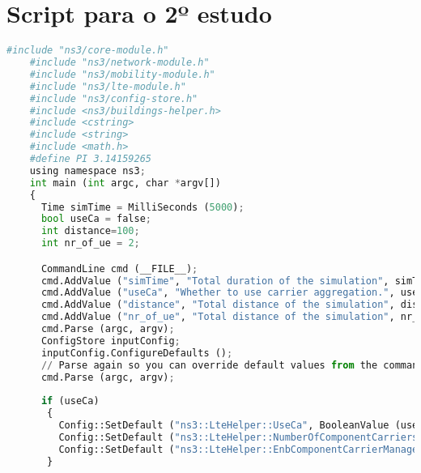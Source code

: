 \section{Script para o 2º estudo} \label{ex2}
\begin{lstlisting}[language=Python, label=py_script, basicstyle=\fontsize{10.5}{12.5}\selectfont]
	#include "ns3/core-module.h"
	#include "ns3/network-module.h"
	#include "ns3/mobility-module.h"
	#include "ns3/lte-module.h"
	#include "ns3/config-store.h"
	#include <ns3/buildings-helper.h>
	#include <cstring>
	#include <string>
	#include <math.h>
	#define PI 3.14159265
	using namespace ns3;
	int main (int argc, char *argv[])
	{
	  Time simTime = MilliSeconds (5000);
	  bool useCa = false;	
	  int distance=100;
	  int nr_of_ue = 2;

	  CommandLine cmd (__FILE__);
	  cmd.AddValue ("simTime", "Total duration of the simulation", simTime);
	  cmd.AddValue ("useCa", "Whether to use carrier aggregation.", useCa);
	  cmd.AddValue ("distance", "Total distance of the simulation", distance);
	  cmd.AddValue ("nr_of_ue", "Total distance of the simulation", nr_of_ue);
	  cmd.Parse (argc, argv);
	  ConfigStore inputConfig;
	  inputConfig.ConfigureDefaults ();
	  // Parse again so you can override default values from the command line
	  cmd.Parse (argc, argv);
	
	  if (useCa)
	   {
		 Config::SetDefault ("ns3::LteHelper::UseCa", BooleanValue (useCa));
		 Config::SetDefault ("ns3::LteHelper::NumberOfComponentCarriers", UintegerValue (2));
		 Config::SetDefault ("ns3::LteHelper::EnbComponentCarrierManager", StringValue ("ns3::RrComponentCarrierManager"));
	   }
	

\end{lstlisting}

